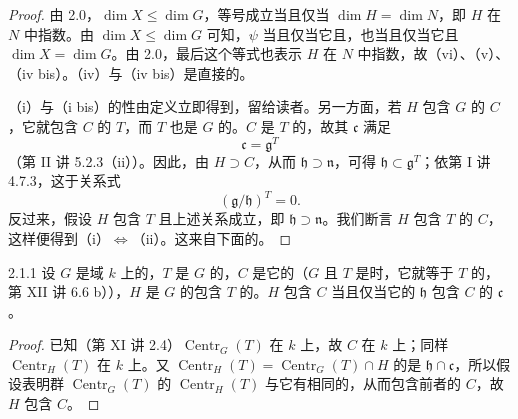 \begin{proof}
由 2.0，$\dim X\leq\dim G$，等号成立当且仅当 $\dim H=\dim N$，即 $H$ 在 $N$ 中指数。由 $\dim X\leq\dim G$ 可知，$\psi$ 当且仅当它且，也当且仅当它且 $\dim X=\dim G$。由 2.0，最后这个等式也表示 $H$ 在 $N$ 中指数，故（vi）、（v）、（iv bis）。（iv）与（iv bis）是直接的。

（i）与（i bis）的性由定义立即得到，留给读者。另一方面，若 $H$ 包含 $G$ 的 $C$，它就包含 $C$ 的 $T$，而 $T$ 也是 $G$ 的。$C$ 是 $T$ 的，故其 $\mathfrak c$ 满足
\[\mathfrak c=\mathfrak g^T\]
（第 II 讲 5.2.3（ii））。因此，由 $H\supset C$，从而 $\mathfrak h\supset\mathfrak n$，可得 $\mathfrak h\subset\mathfrak g^T$；依第 I 讲 4.7.3，这于关系式
\[(\mathfrak g/\mathfrak h)^T=0.\tag{x}\]
反过来，假设 $H$ 包含 $T$ 且上述关系成立，即 $\mathfrak h\supset\mathfrak n$。我们断言 $H$ 包含 $T$ 的 $C$，这样便得到（i）$\Leftrightarrow$（ii）。这来自下面的。
\end{proof}
\begin{SGAresult}{}{2.1.1}
设 $G$ 是域 $k$ 上的，$T$ 是 $G$ 的，$C$ 是它的（$G$ 且 $T$ 是时，它就等于 $T$ 的，第 XII 讲 6.6 b）），$H$ 是 $G$ 的包含 $T$ 的。$H$ 包含 $C$ 当且仅当它的 $\mathfrak h$ 包含 $C$ 的 $\mathfrak c$。
\end{SGAresult}
\begin{proof}
已知（第 XI 讲 2.4）$\operatorname{Centr}_G(T)$ 在 $k$ 上，故 $C$ 在 $k$ 上；同样 $\operatorname{Centr}_H(T)$ 在 $k$ 上。又 $\operatorname{Centr}_H(T)=\operatorname{Centr}_G(T)\cap H$ 的是 $\mathfrak h\cap\mathfrak c$，所以假设表明群 $\operatorname{Centr}_G(T)$ 的 $\operatorname{Centr}_H(T)$ 与它有相同的，从而包含前者的 $C$，故 $H$ 包含 $C$。
\end{proof}
